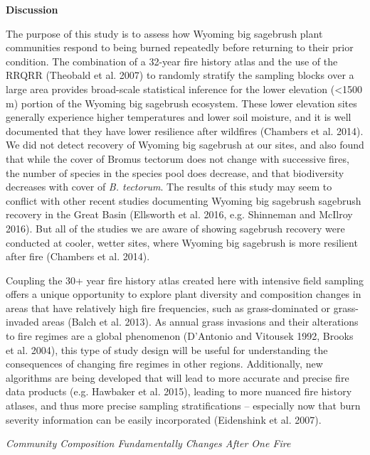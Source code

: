 \documentclass[12pt,]{article}
\begin{document}
\textbf{Discussion}

The purpose of this study is to assess how Wyoming big sagebrush plant
communities respond to being burned repeatedly before returning to their
prior condition. The combination of a 32-year fire history atlas and the
use of the RRQRR (Theobald et al. 2007) to randomly stratify the
sampling blocks over a large area provides broad-scale statistical
inference for the lower elevation (\textless{}1500 m) portion of the
Wyoming big sagebrush ecosystem. These lower elevation sites generally
experience higher temperatures and lower soil moisture, and it is well
documented that they have lower resilience after wildfires (Chambers et
al. 2014). We did not detect recovery of Wyoming big sagebrush at our
sites, and also found that while the cover of Bromus tectorum does not
change with successive fires, the number of species in the species pool
does decrease, and that biodiversity decreases with cover of \emph{B.
tectorum}. The results of this study may seem to conflict with other
recent studies documenting Wyoming big sagebrush sagebrush recovery in
the Great Basin (Ellsworth et al. 2016, e.g. Shinneman and McIlroy
2016). But all of the studies we are aware of showing sagebrush recovery
were conducted at cooler, wetter sites, where Wyoming big sagebrush is
more resilient after fire (Chambers et al. 2014).

Coupling the 30+ year fire history atlas created here with intensive
field sampling offers a unique opportunity to explore plant diversity
and composition changes in areas that have relatively high fire
frequencies, such as grass-dominated or grass-invaded areas (Balch et
al. 2013). As annual grass invasions and their alterations to fire
regimes are a global phenomenon (D'Antonio and Vitousek 1992, Brooks et
al. 2004), this type of study design will be useful for understanding
the consequences of changing fire regimes in other regions.
Additionally, new algorithms are being developed that will lead to more
accurate and precise fire data products (e.g. Hawbaker et al. 2015),
leading to more nuanced fire history atlases, and thus more precise
sampling stratifications -- especially now that burn severity
information can be easily incorporated (Eidenshink et al. 2007).

\emph{Community Composition Fundamentally Changes After One Fire}
\end{document}
